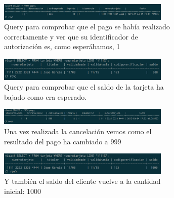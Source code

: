 \documentclass[a4paper, 10pt]{article}
\begin{document}
\begin{figure}[H]
\centering
	\begin{subfigure}{\textwidth}
		\centering
		\includegraphics[width=0.9\textwidth]{pantallazos/ejercicio12a.png}
		\caption{Query para comprobar que el pago se había realizado correctamente y ver que su identificador de autorización es, como esperábamos, 1}
	\end{subfigure}

	\begin{subfigure}{\textwidth}
		\centering
		\includegraphics[width=0.9\textwidth]{pantallazos/ejercicio12b.png}
		\caption{Query para comprobar que el saldo de la tarjeta ha bajado como era esperado.}
	\end{subfigure}

	\begin{subfigure}{\textwidth}
		\centering
		\includegraphics[width=0.9\textwidth]{pantallazos/ejercicio12c.png}
		\caption{Una vez realizada la cancelación vemos como el resultado del pago ha cambiado a 999}
	\end{subfigure}

	\begin{subfigure}{\textwidth}
		\centering
		\includegraphics[width=0.9\textwidth]{pantallazos/ejercicio12d.png}
		\caption{Y también el saldo del cliente vuelve a la cantidad inicial: 1000}
	\end{subfigure}
\caption{}
\end{figure}




\end{document}
